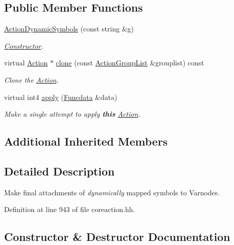 \subsection*{Public Member Functions}
\begin{DoxyCompactItemize}
\item 
\mbox{\hyperlink{class_action_dynamic_symbols_a635ac54796ce1cbe793cd1ef8190db59}{Action\+Dynamic\+Symbols}} (const string \&g)
\begin{DoxyCompactList}\small\item\em \mbox{\hyperlink{class_constructor}{Constructor}}. \end{DoxyCompactList}\item 
virtual \mbox{\hyperlink{class_action}{Action}} $\ast$ \mbox{\hyperlink{class_action_dynamic_symbols_aff1299c36f20a83a2efd54768e58abeb}{clone}} (const \mbox{\hyperlink{class_action_group_list}{Action\+Group\+List}} \&grouplist) const
\begin{DoxyCompactList}\small\item\em Clone the \mbox{\hyperlink{class_action}{Action}}. \end{DoxyCompactList}\item 
virtual int4 \mbox{\hyperlink{class_action_dynamic_symbols_aa3c25f3a649481cc9c783609295b60b8}{apply}} (\mbox{\hyperlink{class_funcdata}{Funcdata}} \&data)
\begin{DoxyCompactList}\small\item\em Make a single attempt to apply {\bfseries{this}} \mbox{\hyperlink{class_action}{Action}}. \end{DoxyCompactList}\end{DoxyCompactItemize}
\subsection*{Additional Inherited Members}


\subsection{Detailed Description}
Make final attachments of {\itshape dynamically} mapped symbols to Varnodes. 

Definition at line 943 of file coreaction.\+hh.



\subsection{Constructor \& Destructor Documentation}
\mbox{\label{class_action_dynamic_symbols_a635ac54796ce1cbe793cd1ef8190db59}} 
